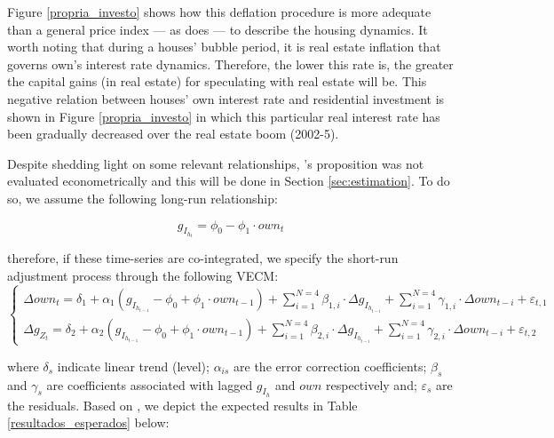 \documentclass[12pt, a4paper]{article}
\begin{document}
Figure \ref{propria_investo} shows how this deflation procedure is more adequate than a general price index --- as \textcite[p.~143--6]{fair_macroeconometric_2013} does --- to describe the housing dynamics. It worth noting that during a houses' bubble period, it is real estate inflation that governs own's interest rate dynamics.
Therefore, the lower this rate is, the greater the capital gains (in real estate) for speculating with real estate will be. This negative relation between houses' own interest rate and residential investment is shown in Figure \ref{propria_investo} in which this particular real interest rate has been gradually decreased over the real estate boom (2002-5).

Despite shedding light on some relevant relationships, \citeauthor*{teixeira_crescimento_2015}'s \citeyear{teixeira_crescimento_2015} proposition was not evaluated econometrically and this will be done in Section \ref{sec:estimation}. To do so, we assume the following long-run relationship:

\begin{equation}
g_{I_{h_{t}}} = \phi_0 - \phi_1\cdot own_t
\end{equation}

therefore, if these time-series are co-integrated, we specify the short-run adjustment process through the following VECM:
\begin{equation}
\begin{cases}
\Delta own_t = \delta_{1} + \alpha_1\left(g_{I_{h_{t-1}}} - \phi_0 + \phi_1\cdot own_{t-1}\right) + {\sum^{N=4}_{i=1}}\beta_{1,i}\cdot \Delta g_{I_{h_{t-i}}} +
\sum^{N=4}_{i=1}\gamma_{1,i}\cdot \Delta own_{t-i} +\varepsilon_{t,1}
\\
\Delta g_{Z_{t}} = \delta_{2} + \alpha_2\left(g_{I_{h_{t-1}}} - \phi_0 + \phi_1\cdot own_{t-1}\right) + \sum^{N=4}_{i=1}\beta_{2,i}\cdot \Delta g_{I_{h_{t-i}}} +
\sum^{N=4}_{i=1}\gamma_{2,i}\cdot \Delta own_{t-i} +\varepsilon_{t,2}
\end{cases}
\end{equation}

where \(\delta_s\) indicate linear trend (level);
\(\alpha_{is}\) are the error correction coefficients;
\(\beta_s\) and \(\gamma_s\) are coefficients associated with lagged \(g_{I_h}\) and \(own\) respectively and; \(\varepsilon_s\) are the residuals.
Based on \textcite{teixeira_crescimento_2015}, we depict the expected results in Table \ref{resultados_esperados} below:


\end{document}
